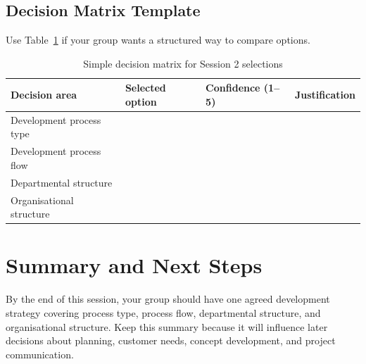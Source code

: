 \subsection{Decision Matrix Template}

Use Table~\ref{tab:session2-decision-matrix} if your group wants a structured way to compare options.

\begin{table}[htbp]
\centering
\caption{Simple decision matrix for Session 2 selections}
\label{tab:session2-decision-matrix}
\renewcommand{\arraystretch}{1.2}
\begin{tabularx}{\textwidth}{|>{\raggedright\arraybackslash}p{}|>{\raggedright\arraybackslash}p{}|>{\raggedright\arraybackslash}p{}|X|}
\hline
\textbf{Decision area} & \textbf{Selected option} & \textbf{Confidence (1--5)} & \textbf{Justification} \\
\hline
Development process type &  &  &  \\
\hline
Development process flow &  &  &  \\
\hline
Departmental structure &  &  &  \\
\hline
Organisational structure &  &  &  \\
\hline
\end{tabularx}
\end{table}

\section{Summary and Next Steps}

By the end of this session, your group should have one agreed development strategy covering process type, process flow, departmental structure, and organisational structure. Keep this summary because it will influence later decisions about planning, customer needs, concept development, and project communication.
